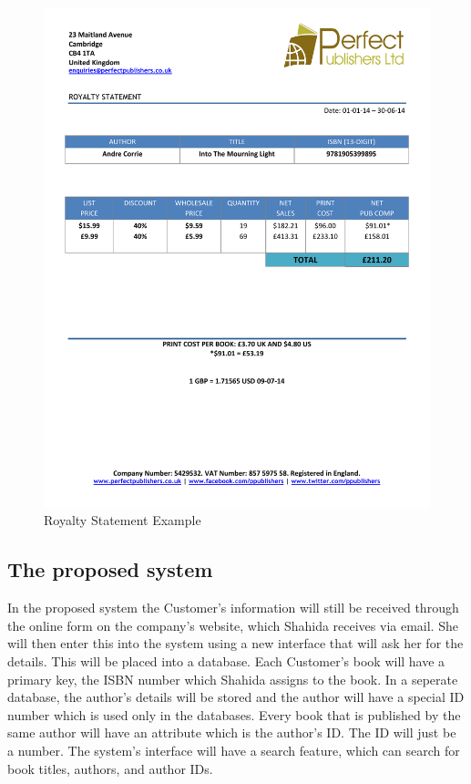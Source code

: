 \begin{figure}[H]
    \includegraphics[width=\textwidth]{./Analysis/Royalty_Statement_Example.pdf}
    \caption{Royalty Statement Example} \label{Royalty_Statement_Example.pdf}
\end{figure}

\subsection{The proposed system}

In the proposed system the Customer's information will still be received through the online form on the company's website, which Shahida receives via email. She will then enter this into the system using a new interface that will ask her for the details. This will be placed into a database. Each Customer's book will have a primary key, the ISBN number which Shahida assigns to the book. In a seperate database, the author's details will be stored and the author will have a special ID number which is used only in the databases. Every book that is published by the same author will have an attribute which is the author's ID. The ID will just be a number. The system's interface will have a search feature, which can search for book titles, authors, and author IDs.

